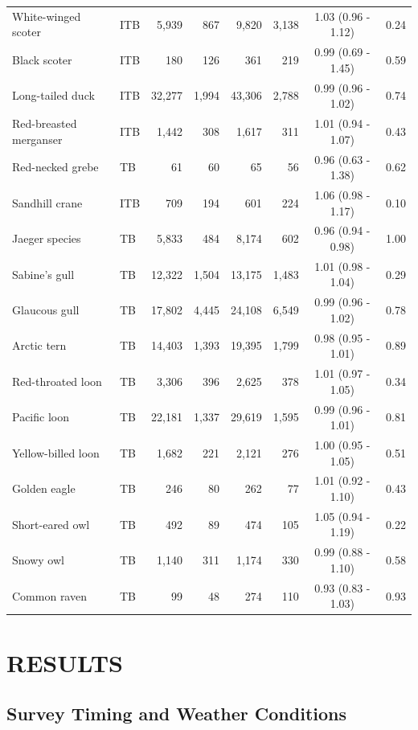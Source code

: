 \documentclass[
]{article}
\begin{document}
\begin{longtable}[t]{llrrrrcc}
White-winged scoter & ITB & 5,939 & 867 & 9,820 & 3,138 & 1.03 (0.96 - 1.12) & 0.24\\
Black scoter & ITB & 180 & 126 & 361 & 219 & 0.99 (0.69 - 1.45) & 0.59\\
Long-tailed duck & ITB & 32,277 & 1,994 & 43,306 & 2,788 & 0.99 (0.96 - 1.02) & 0.74\\
Red-breasted merganser & ITB & 1,442 & 308 & 1,617 & 311 & 1.01 (0.94 - 1.07) & 0.43\\
\addlinespace
Red-necked grebe & TB & 61 & 60 & 65 & 56 & 0.96 (0.63 - 1.38) & 0.62\\
Sandhill crane & ITB & 709 & 194 & 601 & 224 & 1.06 (0.98 - 1.17) & 0.10\\
Jaeger species & TB & 5,833 & 484 & 8,174 & 602 & 0.96 (0.94 - 0.98) & 1.00\\
Sabine's gull & TB & 12,322 & 1,504 & 13,175 & 1,483 & 1.01 (0.98 - 1.04) & 0.29\\
Glaucous gull & TB & 17,802 & 4,445 & 24,108 & 6,549 & 0.99 (0.96 - 1.02) & 0.78\\
\addlinespace
Arctic tern & TB & 14,403 & 1,393 & 19,395 & 1,799 & 0.98 (0.95 - 1.01) & 0.89\\
Red-throated loon & TB & 3,306 & 396 & 2,625 & 378 & 1.01 (0.97 - 1.05) & 0.34\\
Pacific loon & TB & 22,181 & 1,337 & 29,619 & 1,595 & 0.99 (0.96 - 1.01) & 0.81\\
Yellow-billed loon & TB & 1,682 & 221 & 2,121 & 276 & 1.00 (0.95 - 1.05) & 0.51\\
Golden eagle & TB & 246 & 80 & 262 & 77 & 1.01 (0.92 - 1.10) & 0.43\\
\addlinespace
Short-eared owl & TB & 492 & 89 & 474 & 105 & 1.05 (0.94 - 1.19) & 0.22\\
Snowy owl & TB & 1,140 & 311 & 1,174 & 330 & 0.99 (0.88 - 1.10) & 0.58\\
Common raven & TB & 99 & 48 & 274 & 110 & 0.93 (0.83 - 1.03) & 0.93\\
\bottomrule

\end{longtable}

\endgroup{}

\section*{RESULTS}\label{results}

\subsection*{Survey Timing and Weather
Conditions}\label{survey-timing-and-weather-conditions-1}
\end{document}
